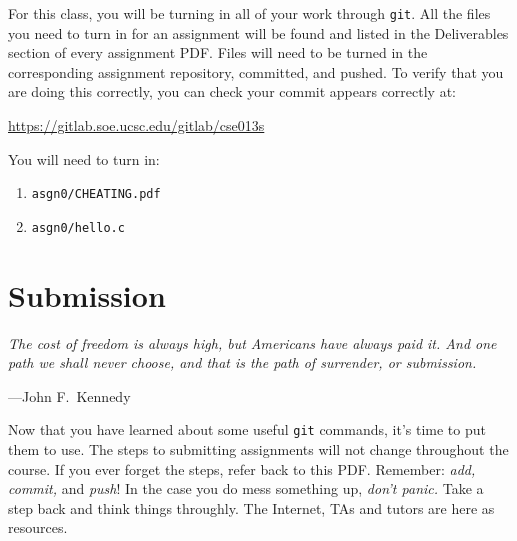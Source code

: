 \documentclass[11pt]{article}
\newcommand\asgn[0]{asgn0}
\begin{document}
\noindent For this class, you will be turning in all of your work
through \texttt{git}. All the files you need to turn in for an
assignment will be found and listed in the Deliverables section of
every assignment PDF. Files will need to be turned in the corresponding
assignment repository, committed, and pushed. To verify that you
are doing this correctly, you can check your commit appears correctly
at:

\centerline{\url{https://gitlab.soe.ucsc.edu/gitlab/cse013s}}


You will need to turn in:
\begin{enumerate}
	\item \texttt{\asgn/CHEATING.pdf}
	\item \texttt{\asgn/hello.c}
\end{enumerate}


\section{Submission}
\epigraph{\emph{The cost of freedom is always high, but Americans have always
paid it. And one path we shall never choose, and that is the path of
surrender, or submission.}}{---John F.\ Kennedy}\noindent

\noindent Now that you have learned about some useful \texttt{git} commands, it's time to put them to use. The steps to submitting assignments will not change throughout the course. If you ever forget the steps, refer back to this PDF. Remember: \emph{add, commit,} and \emph{push}! In the case you do mess something up, \emph{don't panic.} Take a step back and think things throughly. The Internet, TAs and tutors are here as resources. 
\end{document}
